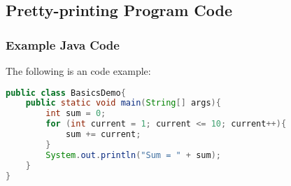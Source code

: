 \subsection{Pretty-printing Program Code}
\subsubsection{Example Java Code}
The following is an code example:
\begin{lstlisting}[language=Java]
public class BasicsDemo{
    public static void main(String[] args){
        int sum = 0;
        for (int current = 1; current <= 10; current++){
            sum += current;
        }
        System.out.println("Sum = " + sum);
    }
}
\end{lstlisting}
